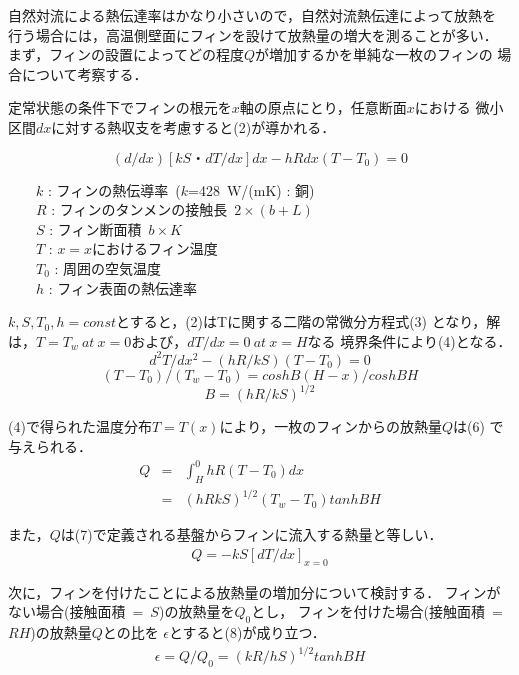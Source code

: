\documentclass[twocolumn, 10pt,a4j]{jsarticle}
\begin{document}
  自然対流による熱伝達率はかなり小さいので，自然対流熱伝達によって放熱を
  行う場合には，高温側壁面にフィンを設けて放熱量の増大を測ることが多い．
  まず，フィンの設置によってどの程度$Q$が増加するかを単純な一枚のフィンの
  場合について考察する．
    \par 定常状態の条件下でフィンの根元を$x$軸の原点にとり，任意断面$x$における
  微小区間$dx$に対する熱収支を考慮すると(2)が導かれる．
    \begin{center}
      \begin{equation}
        (d/dx)[kS・dT / dx]dx - hRdx(T - T_{0}) = 0
      \end{equation}
      \begin{flushleft}
        \ \ \ \ $k$ : フィンの熱伝導率\ ($k$=428\ W/(mK) : 銅) \\
        \ \ \ \ $R$ : フィンのタンメンの接触長\ $2 \times (b+L)$ \\
        \ \ \ \ $S$ : フィン断面積\ $b \times K$ \\
        \ \ \ \ $T$ : $x=x$におけるフィン温度 \\
        \ \ \ \ $T_{0}$ : 周囲の空気温度 \\
        \ \ \ \ $h$ : フィン表面の熱伝達率  
      \end{flushleft}
    \end{center}
    \par $k, S, T_{0}, h = const$とすると，(2)はTに関する二階の常微分方程式(3)
    となり，解は，$T=T_{w}\ at\ x = 0$および，$dT/dx = 0\ at\ x = H$なる
    境界条件により(4)となる．
      \begin{equation}
        d^{2}T / dx^{2} - (hR / kS)(T - T_{0})=0
      \end{equation}
      \begin{equation}
        (T - T_{0}) / (T_{w} - T_{0}) = coshB(H - x) / cosh BH
      \end{equation}
      \begin{equation}
        B = (hR / kS)^{1/2}
      \end{equation}
    
    \par (4)で得られた温度分布$T=T(x)$により，一枚のフィンからの放熱量$Q$は(6)
    で与えられる．
    \begin{eqnarray}
      Q &=& \int_H^0 hR(T - T_{0})dx \nonumber \\
        &=& (hRkS)^{1/2} (T_{w} - T_{0})tanh BH
    \end{eqnarray}
      \par また，$Q$は(7)で定義される基盤からフィンに流入する熱量と等しい．
    \begin{eqnarray}
      Q = -kS[dT / dx]_{x=0}
    \end{eqnarray}
      \par 次に，フィンを付けたことによる放熱量の増加分について検討する．
    フィンがない場合(接触面積\ =\ $S$)の放熱量を$Q_{0}$とし，
    フィンを付けた場合(接触面積\ =\ $RH$)の放熱量$Q$との比を
    $\epsilon$とすると(8)が成り立つ．
    \begin{eqnarray}
      \epsilon = Q/Q_{0} = (kR / hS)^{1/2}tanh BH
    \end{eqnarray}
\end{document}
